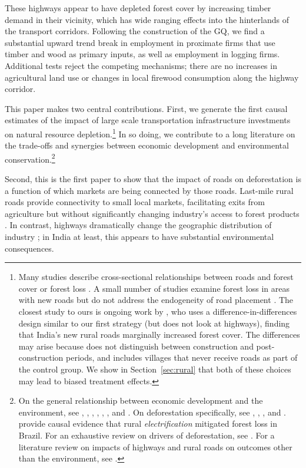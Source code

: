 These highways appear to have depleted forest cover by increasing
timber demand in their vicinity, which has wide ranging effects into
the hinterlands of the transport corridors. Following the construction
of the GQ, we find a substantial upward trend break in employment in
proximate firms that use timber and wood as primary inputs, as well as
employment in logging firms. Additional tests reject the competing
mechanisms; there are no increases in agricultural land use or changes
in local firewood consumption along the highway corridor.

This paper makes two central contributions. First, we generate the
first causal estimates of the impact of large scale transportation
infrastructure investments on natural resource
depletion.\footnote{Many studies describe cross-sectional
  relationships between roads and forest cover or forest loss
  \cite{CD96,AK99,AP99,CPGGB01,GL02,DHURG11,BCCL14,LDU15,DW16}. A
  small number of studies examine forest loss in areas with new roads
  but do not address the endogeneity of road placement
  \cite{PR07,WR08}. The closest study to ours is ongoing work by
  , who uses a difference-in-differences design
  similar to our first strategy (but does not look at highways),
  finding that India's new rural roads marginally increased forest
  cover. The differences may arise because  does not
  distinguish between construction and post-construction periods, and
  includes villages that never receive roads as part of the control
  group. We show in Section~\ref{sec:rural} that both of these choices
  may lead to biased treatment effects.}  In so doing, we contribute
to a long literature on the trade-offs and synergies between economic
development and environmental conservation.\footnote{On the general
  relationship between economic development and the environment, see
  , , ,
  , , ,
   and . On deforestation
  specifically, see , ,
  , and . 
  provide causal evidence that rural \textit{electrification}
  mitigated forest loss in Brazil. For an exhaustive review on drivers
  of deforestation, see . For a literature review on
  impacts of highways and rural roads on outcomes other than the
  environment, see .}

Second, this is the first paper to show that the impact of roads on
deforestation is a function of which markets are being connected by
those roads. Last-mile rural roads provide connectivity to small local
markets, facilitating exits from agriculture but without significantly
changing industry's access to forest products \cite{AN17}. In
contrast, highways dramatically change the geographic distribution of
industry \cite{GGK16}; in India at least, this appears to have
substantial environmental consequences.

